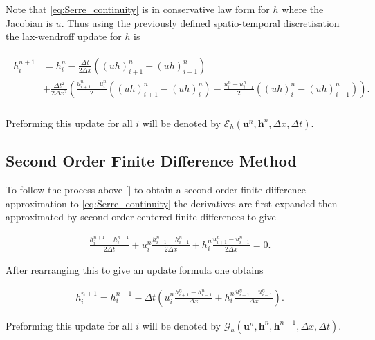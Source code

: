 \documentclass[SingleSpace,12pt,Proceedings]{Serre_ASCE}
\begin{document}
Note that \eqref{eq:Serre_continuity} is in conservative law form for $h$ where the Jacobian is $u$. Thus using the previously defined spatio-temporal discretisation the lax-wendroff update for $h$ is
\begin{linenomath*}
\begin{gather}
\begin{split}
h^{n+1}_i &= h^{n}_i - \frac{\Delta t}{2\Delta x} \left(\left(uh\right)^n_{i+1} - \left(uh\right)^n_{i-1}\right) \\ &+ \frac{\Delta t^2}{2\Delta x^2}\left(\frac{u^n_{i+1} - u^n_{i} }{2}\left(\left(uh\right)^n_{i+1} - \left(uh\right)^n_{i}\right) - \frac{u^n_{i} - u^n_{i-1} }{2}\left(\left(uh\right)^n_{i} - \left(uh\right)^n_{i-1}\right) \right). \\
\end{split}
\label{eq:LW4h}
\end{gather}
\end{linenomath*}
Preforming this update for all $i$ will be denoted by $\mathcal{E}_h\left(\boldsymbol{u}^n,\boldsymbol{h}^n ,\Delta x, \Delta t \right)$.

\subsection{Second Order Finite Difference Method}
To follow the process above [] to obtain a second-order finite difference approximation to \eqref{eq:Serre_continuity} the derivatives are first expanded then approximated by second order centered finite differences to give
\begin{linenomath*}
\begin{gather}
\frac{h^{n+1}_i - h^{n-1}_i}{2\Delta t} + u^{n}_{i}\frac{h^{n}_{i+1} - h^{n}_{i-1}}{2\Delta x} + h^{n}_{i}\frac{u^{n}_{i+1} - u^{n}_{i-1}}{2\Delta x} = 0.
\end{gather}
\end{linenomath*}
After rearranging this to give an update formula one obtains
\begin{linenomath*}
\begin{gather}
h^{n+1}_i = h^{n-1}_i - \Delta t \left(u^{n}_{i}\frac{h^{n}_{i+1} - h^{n}_{i-1}}{\Delta x} + h^{n}_{i}\frac{u^{n}_{i+1} - u^{n}_{i-1}}{\Delta x}\right).
\end{gather}
\end{linenomath*}
Preforming this update for all $i$ will be denoted by $\mathcal{G}_h\left(\boldsymbol{u}^n,\boldsymbol{h}^n,\boldsymbol{h}^{n-1} ,\Delta x, \Delta t \right)$.
\end{document}
